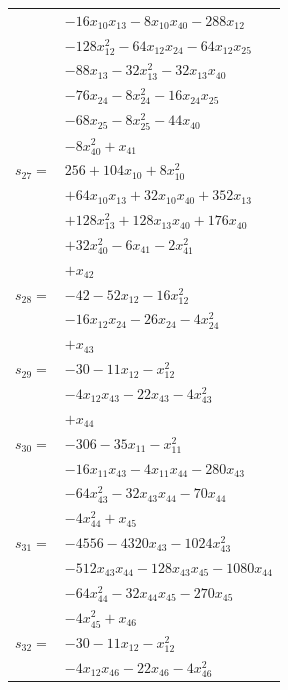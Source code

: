 \begin{longtable}{@{}r@{\;}l@{}}
 & \(\displaystyle -16x_{10}x_{13} -8x_{10}x_{40} -288x_{12}\) \\
 & \(\displaystyle -128x_{12}^{2} -64x_{12}x_{24} -64x_{12}x_{25}\) \\
 & \(\displaystyle -88x_{13} -32x_{13}^{2} -32x_{13}x_{40}\) \\
 & \(\displaystyle -76x_{24} -8x_{24}^{2} -16x_{24}x_{25}\) \\
 & \(\displaystyle -68x_{25} -8x_{25}^{2} -44x_{40}\) \\
 & \(\displaystyle -8x_{40}^{2} +x_{41}\) \\[3pt]
\(s_{27}=\) & \(\displaystyle 256 +104x_{10} +8x_{10}^{2}\) \\
 & \(\displaystyle +64x_{10}x_{13} +32x_{10}x_{40} +352x_{13}\) \\
 & \(\displaystyle +128x_{13}^{2} +128x_{13}x_{40} +176x_{40}\) \\
 & \(\displaystyle +32x_{40}^{2} -6x_{41} -2x_{41}^{2}\) \\
 & \(\displaystyle +x_{42}\) \\[3pt]
\(s_{28}=\) & \(\displaystyle -42 -52x_{12} -16x_{12}^{2}\) \\
 & \(\displaystyle -16x_{12}x_{24} -26x_{24} -4x_{24}^{2}\) \\
 & \(\displaystyle +x_{43}\) \\[3pt]
\(s_{29}=\) & \(\displaystyle -30 -11x_{12} -x_{12}^{2}\) \\
 & \(\displaystyle -4x_{12}x_{43} -22x_{43} -4x_{43}^{2}\) \\
 & \(\displaystyle +x_{44}\) \\[3pt]
\(s_{30}=\) & \(\displaystyle -306 -35x_{11} -x_{11}^{2}\) \\
 & \(\displaystyle -16x_{11}x_{43} -4x_{11}x_{44} -280x_{43}\) \\
 & \(\displaystyle -64x_{43}^{2} -32x_{43}x_{44} -70x_{44}\) \\
 & \(\displaystyle -4x_{44}^{2} +x_{45}\) \\[3pt]
\(s_{31}=\) & \(\displaystyle -4556 -4320x_{43} -1024x_{43}^{2}\) \\
 & \(\displaystyle -512x_{43}x_{44} -128x_{43}x_{45} -1080x_{44}\) \\
 & \(\displaystyle -64x_{44}^{2} -32x_{44}x_{45} -270x_{45}\) \\
 & \(\displaystyle -4x_{45}^{2} +x_{46}\) \\[3pt]
\(s_{32}=\) & \(\displaystyle -30 -11x_{12} -x_{12}^{2}\) \\
 & \(\displaystyle -4x_{12}x_{46} -22x_{46} -4x_{46}^{2}\) \\

\end{longtable}

